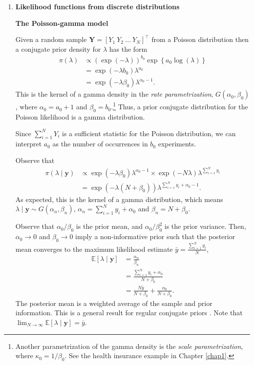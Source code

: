 \begin{enumerate}
	\item \textbf{Likelihood functions from discrete distributions}

\textbf{The Poisson-gamma model}

Given a random sample $\bm{Y}=[Y_1 \ Y_2 \ \dots \ Y_N]^{\top}$ from a Poisson distribution then a conjugate prior density for $\lambda$ has the form 
\begin{align}
	\pi(\lambda)&\propto \left(\exp(-\lambda)\right)^{b_0} \exp\left\{a_0\log(\lambda)\right\}\nonumber\\
	& = \exp(-\lambda b_0) \lambda^{a_0}\nonumber\\
	& = \exp(-\lambda \beta_0) \lambda^{\alpha_0-1}.\nonumber
\end{align}
This is the kernel of a gamma density in the \textit{rate parametrization}, \( G(\alpha_0, \beta_0) \), where \( \alpha_0 = a_0 + 1 \) and \( \beta_0 = b_0 \).\footnote{Another parametrization of the gamma density is the \textit{scale parametrization}, where \( \kappa_0 = 1/\beta_0 \). See the health insurance example in Chapter \ref{chap1}.} Thus, a prior conjugate distribution for the Poisson likelihood is a gamma distribution.

Since \( \sum_{i=1}^N Y_i \) is a sufficient statistic for the Poisson distribution, we can interpret \( a_0 \) as the number of occurrences in \( b_0 \) experiments.

Observe that
\begin{align}
	\pi(\lambda\mid \bm{y})&\propto \exp(-\lambda \beta_0) \lambda^{\alpha_0-1} \times \exp(-N\lambda)\lambda^{\sum_{i=1}^Ny_i}\nonumber\\
	&= \exp(-\lambda(N+\beta_0)) \lambda^{\sum_{i=1}^Ny_i+\alpha_0-1}.\nonumber 
\end{align}
As expected, this is the kernel of a gamma distribution, which means $\lambda\mid \bm{y}\sim G(\alpha_n,\beta_n)$, $\alpha_n=\sum_{i=1}^Ny_i+\alpha_0$ and $\beta_n=N+\beta_0$.

Observe that $\alpha_0/\beta_0$ is the prior mean, and $\alpha_0/\beta_0^2$ is the prior variance. Then, $\alpha_0\rightarrow 0$ and $\beta_0\rightarrow 0$ imply a non-informative prior such that the posterior mean converges to the maximum likelihood estimate $\bar{y}=\frac{\sum_{i=1}^N y_i}{N}$,
\begin{align}
	\mathbb{E}\left[\lambda\mid \bm{y}\right]&=\frac{\alpha_n}{\beta_n}\nonumber\\
	&=\frac{\sum_{i=1}^Ny_i+\alpha_0}{N+\beta_0}\nonumber\\
	&=\frac{N\bar{y}}{N+\beta_0}+\frac{\alpha_0}{N+\beta_0}.\nonumber
\end{align}
The posterior mean is a weighted average of the sample and prior information. This is a general result for regular conjugate priors \cite{diaconis1979conjugate}. Note that \( \lim_{N \to \infty} \mathbb{E}[\lambda \mid \bm{y}] = \bar{y} \).


\end{enumerate}
